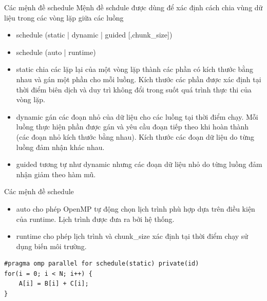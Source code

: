\documentclass[10pt]{beamer}
\theoremstyle{remark}
\numberwithin{algocf}{section}
\numberwithin{equation}{section}
\numberwithin{dl}{section}
\numberwithin{figure}{section}
\begin{document}
\begin{frame}{Các mệnh đề schedule}
    Mệnh đề schdule được dùng để xác định cách chia vùng dữ liệu trong các vòng lặp giữa các luồng
    \begin{itemize}
        \item schedule (static | dynamic | guided [,chunk\_size])
        \item schedule (auto | runtime)
    \end{itemize}
    \begin{itemize}
        \item static chia các lặp lại của một vòng lặp thành các phần có kích thước bằng nhau và gán một phần cho mỗi luồng.
        Kích thước các phần được xác định tại thời điểm biên dịch và duy trì không đổi trong suốt quá trình thực thi của vòng lặp.
        \item dynamic gán các đoạn nhỏ của dữ liệu cho các luồng tại thời điểm chạy.
        Mỗi luồng thực hiện phần được gán và yêu cầu đoạn tiếp theo khi hoàn thành (các đoạn nhỏ kích thước bằng nhau).
        Kích thước các đoạn dữ liệu do từng luồng đảm nhận khác nhau.
        \item guided tương tự như dynamic nhưng các đoạn dữ liệu nhỏ do từng luồng đảm nhận giảm theo hàm mũ.
    \end{itemize}
\end{frame}

\begin{frame}[fragile]{Các mệnh đề schedule}

    \begin{itemize}
        \item auto cho phép OpenMP tự động chọn lịch trình phù hợp dựa trên điều kiện của runtime.
        Lịch trình được đưa ra bởi hệ thống.
        \item runtime cho phép lịch trình và chunk\_size xác định tại thời điểm chạy sử dụng biến môi trường.
    \end{itemize}
    \begin{verbatim}
#pragma omp parallel for schedule(static) private(id)
for(i = 0; i < N; i++) {
    A[i] = B[i] + C[i];
}
    \end{verbatim}
\end{frame}
\end{document}
